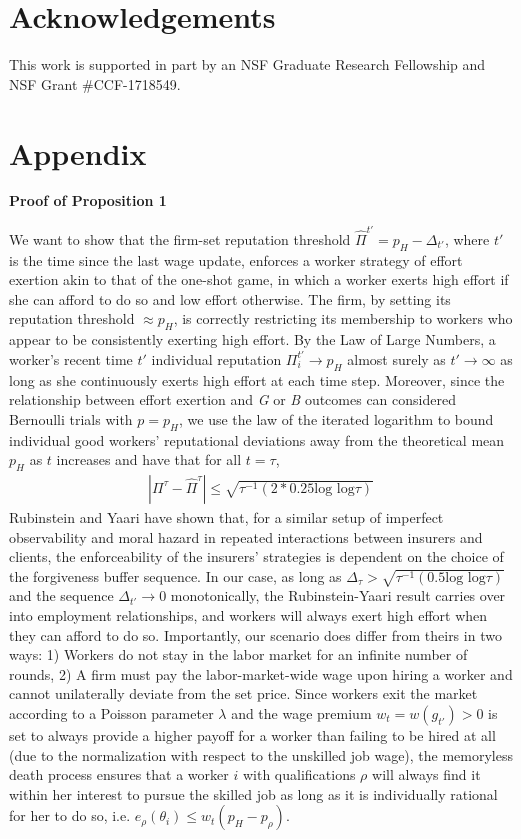 \documentclass[sigconf]{acmart}
\theoremstyle{definition}
\begin{document}
\section*{Acknowledgements}
This work is supported in part by an NSF Graduate Research Fellowship and NSF Grant \#CCF-1718549. 

\section*{Appendix}
\textbf{Proof of Proposition 1}

We want to show that the firm-set reputation threshold $\hat{\Pi}^{t'} = p_H-\Delta_{t'}$, where $t'$ is the time since the last wage update, enforces a worker strategy of effort exertion akin to that of the one-shot game, in which a worker exerts high effort if she can afford to do so and low effort otherwise. The firm, by setting its reputation threshold $\approx p_H$, is correctly restricting its membership to workers who appear to be consistently exerting high effort. By the Law of Large Numbers, a worker's recent time $t'$ individual reputation $\Pi^{t'}_i \to p_H$ almost surely as $t' \to \infty$ as long as she continuously exerts high effort at each time step. Moreover, since the relationship between effort exertion and \textit{G} or \textit{B} outcomes can considered Bernoulli trials with $p=p_H$, we use the law of the iterated logarithm to bound individual good workers' reputational deviations away from the theoretical mean $p_H$ as $t$ increases and have that for all $t=\tau$,
\begin{align}
|\Pi^{\tau}-\hat{\Pi}^{\tau}| \le \sqrt{\tau^{-1}(2*0.25 \text{log log} \tau)} 
\end{align}
Rubinstein and Yaari \cite{rubinstein1983repeated} have shown that, for a similar setup of imperfect observability and moral hazard in repeated interactions between insurers and clients, the enforceability of the insurers' strategies is dependent on the choice of the forgiveness buffer sequence. In our case, as long as $\Delta_{\tau} > \sqrt{\tau^{-1}(0.5\text{log log} \tau)} $ and the sequence $\Delta_{t'} \to 0$ monotonically, the Rubinstein-Yaari result carries over into employment relationships, and workers will always exert high effort when they can afford to do so. Importantly, our scenario does differ from theirs in two ways: 1) Workers do not stay in the labor market for an infinite number of rounds, 2) A firm must pay the labor-market-wide wage upon hiring a worker and cannot unilaterally deviate from the set price. Since workers exit the market according to a Poisson parameter $\lambda$ and the wage premium $w_t = w(g_{t'}) > 0$ is set to always provide a higher payoff for a worker than failing to be hired at all (due to the normalization with respect to the unskilled job wage), the memoryless death process ensures that a worker $i$ with qualifications $\rho$ will always find it within her interest to pursue the skilled job as long as it is individually rational for her to do so, i.e. $e_\rho(\theta_i) \le w_t(p_H-p_\rho)$. 
\vspace{5pt}
\end{document}
